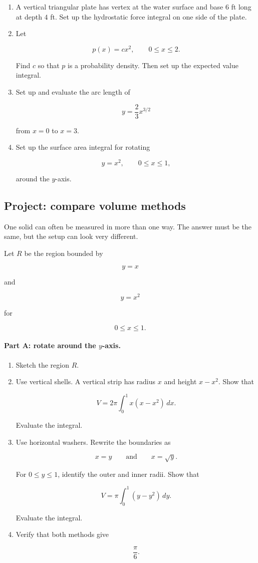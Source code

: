 \begin{enumerate}
\item A vertical triangular plate has vertex at the water surface and base \(6\) ft long at
depth \(4\) ft.  Set up the hydrostatic force integral on one side of the plate.

\item Let

\[
p(x)=cx^2,
\qquad 0\le x\le2.
\]

Find \(c\) so that \(p\) is a probability density.  Then set up the expected value
integral.

\item Set up and evaluate the arc length of

\[
y=\frac23x^{3/2}
\]

from \(x=0\) to \(x=3\).

\item Set up the surface area integral for rotating

\[
y=x^2,
\qquad 0\le x\le1,
\]

around the \(y\)-axis.
\end{enumerate}

\subsection{Project: compare volume methods}
\label{subsec:project-compare-volume-methods}

One solid can often be measured in more than one way.  The answer must be the same,
but the setup can look very different.

Let \(R\) be the region bounded by

\[
y=x
\]

and

\[
y=x^2
\]

for

\[
0\le x\le1.
\]

\paragraph{Part A: rotate around the \(y\)-axis.}

\begin{enumerate}
\item Sketch the region \(R\).

\item Use vertical shells.  A vertical strip has radius \(x\) and height \(x-x^2\).  Show that

\[
V=2\pi\int_0^1 x(x-x^2)\,dx.
\]

Evaluate the integral.

\item Use horizontal washers.  Rewrite the boundaries as

\[
x=y
\qquad\text{and}\qquad
x=\sqrt y.
\]

For \(0\le y\le1\), identify the outer and inner radii.  Show that

\[
V=\pi\int_0^1 (y-y^2)\,dy.
\]

Evaluate the integral.

\item Verify that both methods give

\[
\boxed{\frac{\pi}{6}}.
\]
\end{enumerate}

